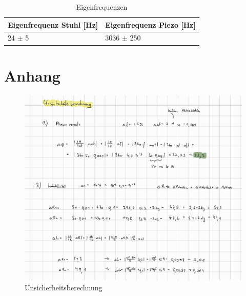 \documentclass[12pt,a4paper,twoside]{article}
\begin{document}
\begin{table}[H]
    \centering
    \caption{Eigenfrequenzen}
    \label{tab:EigenfrequenzenZsmf}
    \begin{tabular}{| l | l |}
        \hline
        Eigenfrequenz Stuhl [Hz] & Eigenfrequenz Piezo [Hz] \\
        \hline
        24 $\pm$ 5 & 3036 $\pm$ 250 \\
        \hline
    \end{tabular}
\end{table}



\section{Anhang} %

\begin{figure}[H]
    \centering
    \includegraphics[width=0.9\linewidth, angle=0]{nudes/Unsicherheitsberechnung.jpg}
    \caption{Unsicherheitsberechnung}
    \label{fig:Unsicherheitsberechnung}
\end{figure}

\printbibliography[heading=bibintoc]
\end{document}
